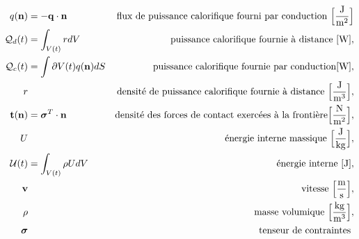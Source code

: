 \begin{align*}
    q(\vb{n}) &= - \vb{q} \cdot \vb{n} & \textrm{flux de puissance calorifique fourni par conduction } \Big[\si{\frac{J}{m^2}}\Big]\\
    \mathcal{Q}_d(t) &= \int_{V(t)} r dV & \textrm{puissance calorifique fournie à distance } [\si{W}], \\
    \mathcal{Q}_c(t) &= \int{\partial V(t)} q(\vb{n}) dS & \textrm{puissance calorifique fournie par conduction} [\si{W}], \\
    r & & \textrm{densité de puissance calorifique fournie à distance } \Big[\si{\frac{J}{m^3}}\Big],\\
    \vb{t}(\vb{n}) &= \boldsymbol{\sigma}^T \cdot \vb{n} & \textrm{densité des forces de contact exercées à la frontière} \Big[\si{\frac{N}{m^2}}\Big],\\
    U & & \textrm{énergie interne massique } \Big[\si{\frac{J}{kg}}\Big],\\
    \mathcal{U}(t) &= \int_{V(t)} \rho U dV & \textrm{énergie interne } [\si{J}],\\
    \vb{v} & & \textrm{vitesse } \Big[\si{\frac{m}{s}}\Big],\\
    \rho & & \textrm{masse volumique } \Big[\si{\frac{kg}{m^3}}\Big],\\
    \boldsymbol{\sigma} & & \textrm{tenseur de contraintes }
  \end{align*}
  \endgroup
